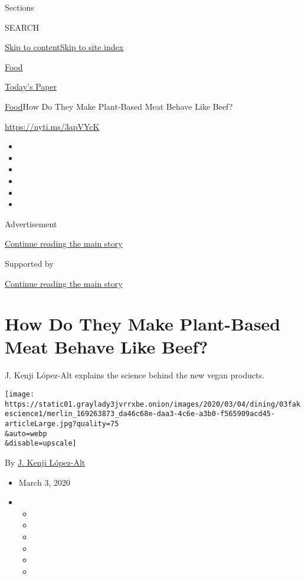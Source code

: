 Sections

SEARCH

\protect\hyperlink{site-content}{Skip to
content}\protect\hyperlink{site-index}{Skip to site index}

\href{https://www.nytimes3xbfgragh.onion/section/food}{Food}

\href{https://myaccount.nytimes3xbfgragh.onion/auth/login?response_type=cookie\&client_id=vi}{}

\href{https://www.nytimes3xbfgragh.onion/section/todayspaper}{Today's
Paper}

\href{/section/food}{Food}\textbar{}How Do They Make Plant-Based Meat
Behave Like Beef?

\url{https://nyti.ms/3apVYcK}

\begin{itemize}
\item
\item
\item
\item
\item
\item
\end{itemize}

Advertisement

\protect\hyperlink{after-top}{Continue reading the main story}

Supported by

\protect\hyperlink{after-sponsor}{Continue reading the main story}

\hypertarget{how-do-they-make-plant-based-meat-behave-like-beef}{%
\section{How Do They Make Plant-Based Meat Behave Like
Beef?}\label{how-do-they-make-plant-based-meat-behave-like-beef}}

J. Kenji López-Alt explains the science behind the new vegan products.

\texttt{[image: https://static01.graylady3jvrrxbe.onion/images/2020/03/04/dining/03fakescience1/merlin\_169263873\_da46c68e-daa3-4c6e-a3b0-f565909acd45-articleLarge.jpg?quality=75\\\&auto=webp\\\&disable=upscale]}

By \href{https://www.nytimes3xbfgragh.onion/by/j-kenji-lopez-alt}{J.
Kenji López-Alt}

\begin{itemize}
\item
  March 3, 2020
\item
  \begin{itemize}
  \item
  \item
  \item
  \item
  \item
  \item
  \end{itemize}
\end{itemize}

